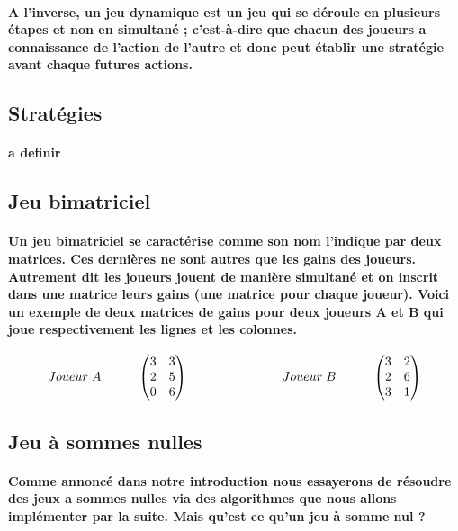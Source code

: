 \documentclass[a4paper, 12pt, twoside]{article}
\begin{document}
\paragraph{A l'inverse, un jeu dynamique est un jeu qui se déroule en plusieurs étapes et non en simultané ; c'est-à-dire que chacun des joueurs a connaissance de l'action de l'autre et donc peut établir une stratégie avant chaque futures actions.  }
\subsection{Stratégies}
\paragraph{a definir}
\subsection{Jeu bimatriciel}
\paragraph{Un jeu bimatriciel se caractérise comme son nom l'indique par deux matrices. Ces dernières ne sont autres que les gains des joueurs. Autrement dit les joueurs jouent de manière simultané et on inscrit dans une matrice leurs gains (une matrice pour chaque joueur). Voici un exemple de deux matrices de gains pour deux joueurs A et B qui joue respectivement les lignes et les colonnes.}

\[
Joueur\hspace{0,1cm} A\hspace{1cm}
\begin{pmatrix}3&3\\
2&5\\
0&6\\
\end{pmatrix}\                      \hspace{2,5cm}  
Joueur\hspace{0,1cm} B \hspace{1cm}  
\begin{pmatrix}3&2\\
2&6\\
3&1\\
\end{pmatrix} 
\]
\subsection{Jeu à sommes nulles}
\paragraph{Comme annoncé dans notre introduction nous essayerons de résoudre des jeux a sommes nulles via des algorithmes que nous allons implémenter par la suite. Mais qu'est ce qu'un jeu à somme nul ? }
\end{document}
